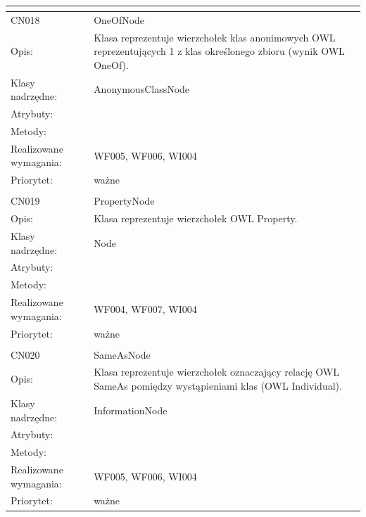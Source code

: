 \begin{center}
\begin{longtable}{|m{3cm}|m{9cm}|}
\multicolumn{2}{c}{} \\
 \hline

CN018 & OneOfNode \\ \hline
Opis: & Klasa reprezentuje wierzchołek klas anonimowych OWL reprezentujących 1 z klas określonego zbioru (wynik OWL OneOf).    \\ \hline
Klasy nadrzędne: & AnonymousClassNode     \\ \hline
Atrybuty: & %
 \\ \hline
Metody: & %
  \\ \hline
Realizowane wymagania: & WF005, WF006, WI004 \\ \hline
Priorytet: & ważne  \\ \hline

\multicolumn{2}{c}{} \\
 \hline

CN019 & PropertyNode \\ \hline
Opis: & Klasa reprezentuje wierzchołek OWL Property.    \\ \hline
Klasy nadrzędne: & Node     \\ \hline
Atrybuty: & %
 \\ \hline
Metody: & %
  \\ \hline
Realizowane wymagania: & WF004, WF007, WI004 \\ \hline
Priorytet: & ważne  \\ \hline

\multicolumn{2}{c}{} \\
 \hline

CN020 & SameAsNode \\ \hline
Opis: & Klasa reprezentuje wierzchołek oznaczający relację OWL SameAs pomiędzy wystąpieniami klas (OWL Individual).    \\ \hline
Klasy nadrzędne: & InformationNode     \\ \hline
Atrybuty: & %
 \\ \hline
Metody: & %
  \\ \hline
Realizowane wymagania: & WF005, WF006, WI004 \\ \hline
Priorytet: & ważne  \\ \hline


\end{longtable}
\end{center}
